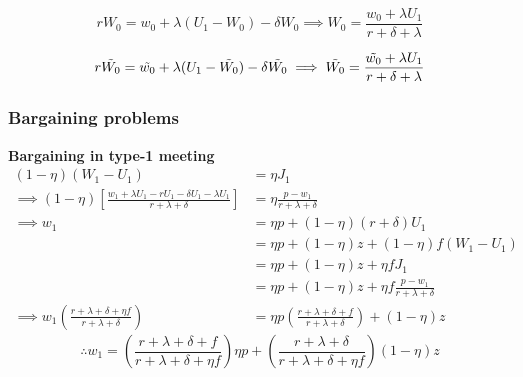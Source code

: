 \documentclass[12pt]{article} %
\theoremstyle{definition}
\begin{document}
\begin{equation}
    rW_0 =w_0+\lambda(U_1-W_0)- \delta W_0 \implies W_0 = \frac{w_0 + \lambda U_1}{r + \delta + \lambda}
\end{equation}

\begin{equation}
    r\Tilde{W_0} =\Tilde{w_0}+\lambda(U_1-\Tilde{W_0})- \delta \Tilde{W_0} \implies \Tilde{W_0} = \frac{\Tilde{w_0} + \lambda U_1}{r + \delta + \lambda}
\end{equation}

\subsubsection{Bargaining problems}
\textbf{Bargaining in type-1 meeting}
\begin{align*}
    (1-\eta)(W_1-U_1) &= \eta J_1 \\
     \implies (1-\eta) \left[ \frac{w_1 + \lambda U_1 - rU_1-\delta U_1 - \lambda U_1}{r+\lambda + \delta}\right] &= \eta \frac{p-w_1}{r+\lambda+\delta} \\
    \implies w_1 &= \eta p + (1-\eta)(r+\delta)U_1 \\
   &= \eta p + (1-\eta)z + (1-\eta)f(W_1-U_1) \\
   &= \eta p + (1-\eta)z + \eta f J_1 \\
   &= \eta p + (1-\eta)z + \eta f \frac{p-w_1}{r+\lambda +\delta} \\ 
   \implies w_1\left(\frac{r+\lambda+\delta+\eta f}{r+\lambda+\delta}\right) &= \eta p \left(\frac{r+\lambda+\delta+f}{r+\lambda+\delta}\right) + (1-\eta)z
\end{align*}
\begin{equation}
    \therefore w_1 = \left(\frac{r+\lambda+\delta+f}{r+\lambda+\delta+\eta f}\right) \eta p + \left(\frac{r+\lambda+\delta}{r+\lambda+\delta+\eta f}\right) (1-\eta)z
\end{equation}
\end{document}
